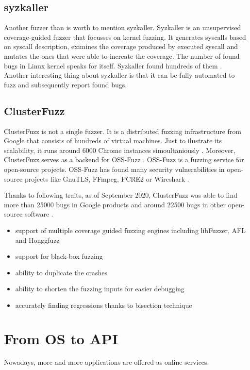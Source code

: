 \subsection{syzkaller}
Another fuzzer than is worth to mention syzkaller. Syzkaller is an unsupervised coverage-guided fuzzer that focusses on kernel fuzzing. It generates syscalls based on syscall description, eximines the coverage produced by executed syscall and mutates the ones that were able to increate the coverage. The number of found bugs in Linux kernel speaks for itself. Syzkaller found hundreds of them \cite{syzkaller2020bugs}. Another interesting thing about syzkaller is that it can be fully automated to fuzz and subsequently report found bugs.


\subsection{ClusterFuzz}
ClusterFuzz is not a single fuzzer. It is a distributed fuzzing infrastructure from Google that consists of hundreds of virtual machines. Just to ilustrate its scalability, it runs around 6000 Chrome instances simoultaniously \cite{xu2017designing}. Moreover, ClusterFuzz serves as a backend for OSS-Fuzz \cite{ossfuzz2020readme}. OSS-Fuzz is a fuzzing service for open-source projects. OSS-Fuzz has found many security vulnerabilities in open-source projects like GnuTLS, FFmpeg, PCRE2 or Wireshark \cite{chang2017oss}.

Thanks to following traits, as of September 2020, ClusterFuzz was able to find more than 25000 bugs in Google products and around 22500 bugs in other open-source software \cite{clusterfuzz2020readme}.

\begin{itemize}
    \item support of multiple coverage guided fuzzing engines including libFuzzer, AFL and Honggfuzz
    \item support for black-box fuzzing
    \item ability to duplicate the crashes
    \item ability to shorten the fuzzing inputs for easier debugging
    \item accurately finding regressions thanks to bisection technique
\end{itemize}


\section{From OS to API}
Nowadays, more and more applications are offered as online services.

